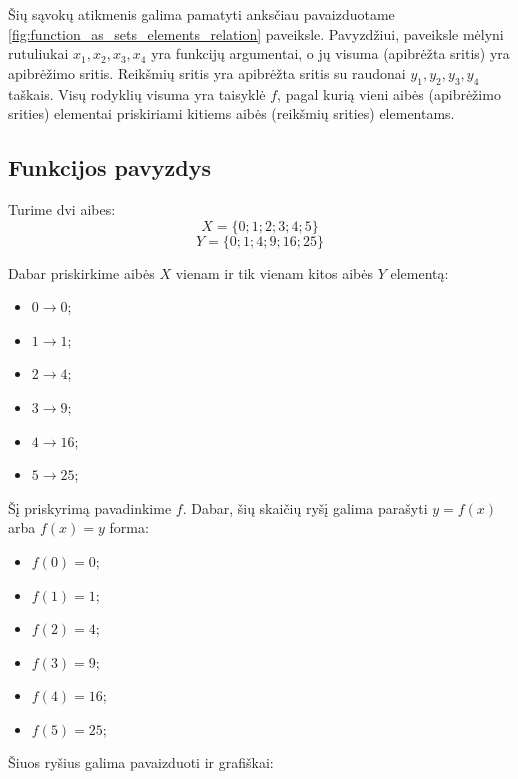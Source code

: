 \documentclass[nobib]{tufte-handout}
\begin{document}
Šių sąvokų atikmenis galima pamatyti anksčiau pavaizduotame
\ref{fig:function_as_sets_elements_relation} paveiksle. Pavyzdžiui, paveiksle
mėlyni rutuliukai $x_1, x_2, x_3, x_4$ yra funkcijų argumentai, o jų visuma
(apibrėžta sritis) yra apibrėžimo sritis. Reikšmių sritis yra apibrėžta sritis
su raudonai $y_1, y_2, y_3, y_4$ taškais. Visų rodyklių visuma yra taisyklė
$f$, pagal kurią vieni aibės (apibrėžimo srities) elementai priskiriami kitiems
aibės (reikšmių srities) elementams.

\subsection{Funkcijos pavyzdys}\label{sec:function_example}

Turime dvi aibes:
$$X =\{0; 1; 2; 3; 4; 5\}$$
$$Y =\{0; 1; 4; 9; 16; 25\}$$

Dabar priskirkime aibės $X$ vienam ir tik vienam kitos aibės $Y$ elementą:
\begin{itemize}
  \item $0 \rightarrow 0$;
  \item $1 \rightarrow 1$;
  \item $2 \rightarrow 4$;
  \item $3 \rightarrow 9$;
  \item $4 \rightarrow 16$;
  \item $5 \rightarrow 25$;
\end{itemize}

Šį priskyrimą pavadinkime $f$. Dabar, šių skaičių ryšį galima parašyti $y=f(x)$
arba $f(x)=y$  forma:
\begin{itemize}
  \item $f(0) = 0$;
  \item $f(1) = 1$;
  \item $f(2) = 4$;
  \item $f(3) = 9$;
  \item $f(4)= 16$;
  \item $f(5) = 25$;
\end{itemize}

Šiuos ryšius galima pavaizduoti ir grafiškai:
\end{document}
